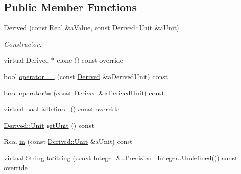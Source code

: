\subsection*{Public Member Functions}
\begin{DoxyCompactItemize}
\item 
\hyperlink{classostk_1_1physics_1_1units_1_1_derived_aa9d64e31cb0027168041184be11b2302}{Derived} (const Real \&a\+Value, const \hyperlink{classostk_1_1physics_1_1units_1_1_derived_1_1_unit}{Derived\+::\+Unit} \&a\+Unit)
\begin{DoxyCompactList}\small\item\em Constructor. \end{DoxyCompactList}\item 
virtual \hyperlink{classostk_1_1physics_1_1units_1_1_derived}{Derived} $\ast$ \hyperlink{classostk_1_1physics_1_1units_1_1_derived_a72a1ae09398204d52a9078da6d36d9d7}{clone} () const override
\item 
bool \hyperlink{classostk_1_1physics_1_1units_1_1_derived_aa20fcc1af55daf9f79d764e2c3d1f1de}{operator==} (const \hyperlink{classostk_1_1physics_1_1units_1_1_derived}{Derived} \&a\+Derived\+Unit) const
\item 
bool \hyperlink{classostk_1_1physics_1_1units_1_1_derived_a34bdca5b46e49122573c2ecd4b5be924}{operator!=} (const \hyperlink{classostk_1_1physics_1_1units_1_1_derived}{Derived} \&a\+Derived\+Unit) const
\item 
virtual bool \hyperlink{classostk_1_1physics_1_1units_1_1_derived_a4221766463c2f4ab478e4a882239eec6}{is\+Defined} () const override
\item 
\hyperlink{classostk_1_1physics_1_1units_1_1_derived_1_1_unit}{Derived\+::\+Unit} \hyperlink{classostk_1_1physics_1_1units_1_1_derived_a85c20f407e3a92bc36f6dbed74cea8bd}{get\+Unit} () const
\item 
Real \hyperlink{classostk_1_1physics_1_1units_1_1_derived_a92880cfa414ae662b754493e9341c5a1}{in} (const \hyperlink{classostk_1_1physics_1_1units_1_1_derived_1_1_unit}{Derived\+::\+Unit} \&a\+Unit) const
\item 
virtual String \hyperlink{classostk_1_1physics_1_1units_1_1_derived_ac1794677978fba5582fb127e032f7398}{to\+String} (const Integer \&a\+Precision=Integer\+::\+Undefined()) const override
\end{DoxyCompactItemize}
